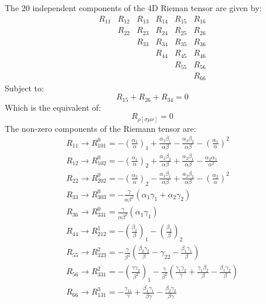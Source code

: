 \documentclass{article}
\begin{document}
The 20 independent components of the 4D Rieman tensor are given by:
\begin{equation}
\begin{array}{cccccc}
R_{11} & R_{12} & R_{13} & R_{14} & R_{15} & R_{16} \\ & R_{22} & R_{23} & R_{24} & R_{25} & R_{26} \\ & & R_{33} & R_{34} & R_{35} & R_{36} \\ & & & R_{44} & R_{45} & R_{46} \\ & & & & R_{55} & R_{56} \\ & & & & & R_{66}
\end{array}
\end{equation}
Subject to:
\begin{equation}
R_{15} + R_{26} + R_{34} = 0
\end{equation}
Which is the equivalent of:
\begin{equation}
R_{\rho[\sigma\mu\nu]}=0
\end{equation}
The non-zero components of the Riemann tensor are:
\begin{equation}
\begin{array}{l}
R_{11}\rightarrow R_{101}^{0}=-\left(\frac{\alpha_{1}}{\alpha}\right)_{1}+\frac{\alpha_{1}\beta_{1}}{\alpha\beta}-\frac{\alpha_{2}\beta_{2}}{\alpha\beta}-\left(\frac{\alpha_{1}}{\alpha}\right)^{2}\\
R_{12}\rightarrow R_{102}^{0}=-\left(\frac{\alpha_{1}}{\alpha}\right)_{2}+\frac{\alpha_{1}\beta_{2}}{\alpha\beta}+\frac{\alpha_{2}\beta_{1}}{\alpha\beta}-\frac{\alpha_{2}\alpha_{1}}{\alpha^{2}}\\
R_{22}\rightarrow R_{202}^{0}=-\left(\frac{\alpha_{2}}{\alpha}\right)_{2}-\frac{\alpha_{1}\beta_{1}}{\alpha\beta}+\frac{\alpha_{2}\beta_{2}}{\alpha\beta}-\left(\frac{\alpha_{2}}{\alpha}\right)^{2}\\
R_{33}\rightarrow R_{303}^{0}=-\frac{\gamma}{\alpha\beta^{2}}\left(\alpha_{1}\gamma_{1}+\alpha_{2}\gamma_{2}\right)\\
R_{36}\rightarrow R_{331}^{0}=\frac{\gamma}{\alpha\beta^{2}}\left(\alpha_{1}\gamma_{1}\right)\\
R_{44}\rightarrow R_{212}^{1}=-\left(\frac{\beta_{1}}{\beta}\right)_{1}-\left(\frac{\beta_{2}}{\beta}\right)_{2}\\
R_{55}\rightarrow R_{323}^{2}=-\frac{\gamma}{\beta^{2}}\left(\frac{\beta_{2}\gamma_{2}}{\beta}-\gamma_{22}-\frac{\beta_{1}\gamma_{1}}{\beta}\right)\\
R_{56}\rightarrow R_{331}^{2}=-\left(\frac{\gamma\gamma_{2}}{\beta^{2}}\right)_{1}-\frac{\gamma}{\beta^{2}}\left(\frac{\gamma_{1}\gamma_{2}}{\gamma}+\frac{\gamma_{1}\beta_{2}}{\beta}-\frac{\beta_{1}\gamma_{2}}{\beta}\right)\\
R_{66}\rightarrow R_{131}^{3}=-\frac{\gamma_{11}}{\gamma}+\frac{\beta_{1}\gamma_{1}}{\beta\gamma}-\frac{\beta_{2}\gamma_{2}}{\beta\gamma}\\
\end{array}
\end{equation}
\end{document}
